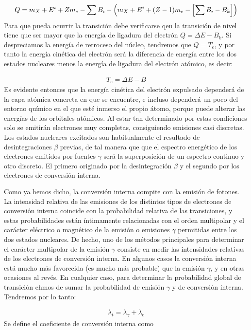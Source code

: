 \begin{eqnarray}
	Q = m_X + E^i + Zm_e - \sum B_i - \left( m_X + E^i + (Z-1)m_e - \left[ \sum B_i - B_k \right] \right)
\end{eqnarray}
Para que pueda ocurrir la transición debe verificarse qeu la transición de nivel tiene que ser mayor que la energía de ligadura del electrón $Q=\Delta E - B_k$. Si despreciamos la energía de retroceso del núcleo, tendremos que $Q=T_e$, y por tanto la energía cinética del electrón será la diferencia de energía entre los dos estados nucleares menos la energía de ligadura del electrón atómico, es decir:

\begin{eqnarray}
	T_e = \Delta E - B
\end{eqnarray}
Es evidente entonces que la energía cinética del electrón expulsado dependerá de la capa atómica concreta en que se encuentre, e incluso dependerá un poco del entorno químico en el que esté inmerso el propio átomo, porque puede alterar las energías de los orbitales atómicos. Al estar tan determinado por estas condiciones solo se emitirán electrones muy completas, consiguiendo emisiones casi discretas. Los estados nucleares excitados son habitualmente el resultado de desintegraciones $\beta$ previas, de tal manera que que el espectro energético de los electrones emitidos por fuentes $\gamma$ será la superposición de un espectro continuo y otro discreto. El primero originado por la desintegración $\beta$ y el segundo por los electrones de conversión interna.

Como ya hemos dicho, la conversión interna compite con la emisión de fotones. La intensidad relativa de las emisiones de los distintos tipos de electrones de conversión interna coincide con la probabilidad relativa de las transiciones, y estas probabilidades están íntimamente relacionadas con el orden multipolar y el carácter eléctrico o magnético de la emisión o emisiones $\gamma$ permitidas entre los dos estados nucleares. De hecho, uno de los métodos principales para determinar el carácter multipolar de la emisión $\gamma$ consiste en medir las intensidades relativas de los electrones de conversión interna. En algunos casos la conversión interna está mucho más favorecida (es mucho más probable) que la emisión $\gamma$, y en otras ocasiones al revés. En cualquier caso, para determinar la probabilidad global de transición ehmos de sumar la probabilidad de emisión $\gamma$ y de conversión interna. Tendremos por lo tanto:

\begin{eqnarray}
	\lambda_t = \lambda_\gamma + \lambda_e
\end{eqnarray}
Se define el coeficiente de conversión interna como

